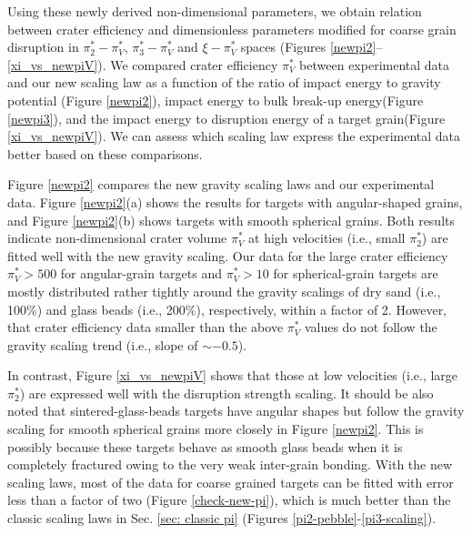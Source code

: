 \documentclass[3p,authoryear]{elsarticle}
\begin{document}
Using these newly derived non-dimensional parameters, we obtain relation between crater efficiency and dimensionless parameters modified for coarse grain disruption in $\pi_2^*-\pi_V^*$, $\pi_3^*-\pi_V^*$ and $\xi - \pi_V^*$ spaces (Figures \ref{newpi2}--\ref{xi_vs_newpiV}).
We compared crater efficiency $\pi_V^*$ between experimental data and our new scaling law as a function of the ratio of impact energy to gravity potential (Figure \ref{newpi2}), impact energy to bulk break-up energy(Figure \ref{newpi3}), and the impact energy to disruption energy of a target grain(Figure \ref{xi_vs_newpiV}).
We can assess which scaling law express the experimental data better based on these comparisons.

Figure \ref{newpi2} compares the new gravity scaling laws and our experimental data. Figure \ref{newpi2}(a) shows the results for targets with angular-shaped grains, and Figure \ref{newpi2}(b) shows targets with smooth spherical grains.
Both results indicate non-dimensional crater volume $\pi_V^*$ at high velocities (i.e., small $\pi_2^*$) are fitted well with the new gravity scaling.
Our data for the large crater efficiency $\pi_V^*> 500$ for angular-grain targets and $\pi_V^*>10$ for spherical-grain targets are mostly distributed rather tightly around the gravity scalings of dry sand (i.e., 100\%) and glass beads (i.e., 200\%), respectively, within a factor of 2.
However, that crater efficiency data smaller than the above $\pi_V^*$ values do not follow the gravity scaling trend (i.e., slope of $\sim -0.5$).

In contrast, Figure \ref{xi_vs_newpiV} shows that those at low velocities (i.e., large $\pi_2^*$) are expressed well with the disruption strength scaling.
It should be also noted that sintered-glass-beads targets have angular shapes but follow the gravity scaling for smooth spherical grains more closely in Figure \ref{newpi2}.
This is possibly because these targets behave as smooth glass beads when it is completely fractured owing to the very weak inter-grain bonding.
With the new scaling laws, most of the data for coarse grained targets can be fitted with error less than a factor of two (Figure \ref{check-new-pi}), which is much better than the classic scaling laws in Sec. \ref{sec: classic pi} (Figures \ref{pi2-pebble}-\ref{pi3-scaling}).
\end{document}
